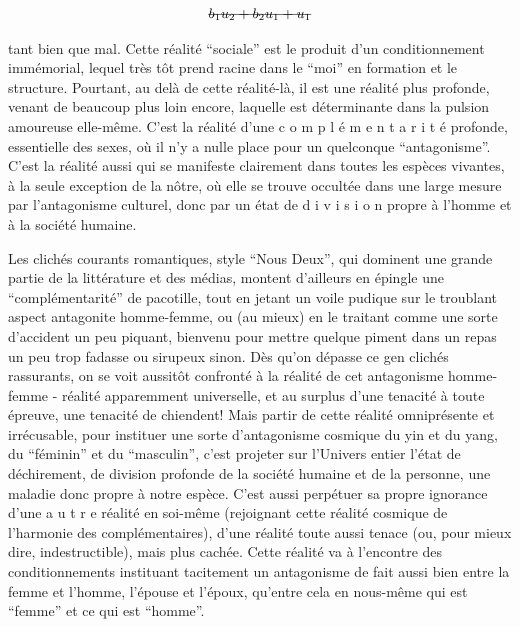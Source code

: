 \[ \deleted{b_1u_2+b_2u_1+u_1} \]



tant bien que mal. Cette réalité ``sociale'' est le produit d'un conditionnement immémorial, lequel très tôt prend racine dans le ``moi'' en formation et le structure. Pourtant, au delà de cette réalité-là, il est une réalité plus profonde, venant de beaucoup plus loin encore, laquelle est déterminante dans la pulsion amoureuse elle-même. C'est la réalité d'une c o m p l é m e n t a r i t é profonde, essentielle des sexes, où il n'y a nulle place pour un quelconque ``antagonisme''. C'est la réalité aussi qui se manifeste clairement dans toutes les espèces vivantes, à la seule exception de la nôtre, où elle se trouve occultée dans une large mesure par l'antagonisme culturel, donc par un état de d i v i s i o n propre à l'homme et à la société humaine.

Les clichés courants romantiques, style ``Nous Deux'', qui dominent une grande partie de la littérature et des médias, montent d'ailleurs en épingle une ``complémentarité'' de pacotille, tout en jetant un voile pudique sur le troublant aspect antagonite homme-femme, ou (au mieux) en le traitant comme une sorte d'accident un peu piquant, bienvenu pour mettre quelque piment dans un repas un peu trop fadasse ou sirupeux sinon. Dès qu'on dépasse ce gen clichés rassurants, on se voit aussitôt confronté à la réalité de cet antagonisme homme-femme - réalité apparemment universelle, et au surplus d'une tenacité à toute épreuve, une tenacité de chiendent! Mais \hspace{.6em}partir de cette réalité omniprésente et irrécusable, pour instituer une sorte d'antagonisme cosmique du yin et du yang, du ``féminin'' et du ``masculin'', c'est projeter sur l'Univers entier l'état de déchirement, de division profonde de la société humaine et de la personne, une maladie donc propre à notre espèce. C'est aussi perpétuer sa propre ignorance d'une a u t r e réalité en soi-même (rejoignant cette réalité cosmique de l'harmonie des complémentaires), d'une réalité toute aussi tenace (ou, pour mieux dire, indestructible), mais plus cachée. Cette réalité va à l'encontre des conditionnements instituant tacitement un antagonisme de fait aussi bien entre la femme et l'homme, l'épouse et l'époux, qu'entre cela en nous-même qui est ``femme'' et ce qui est ``homme''.


